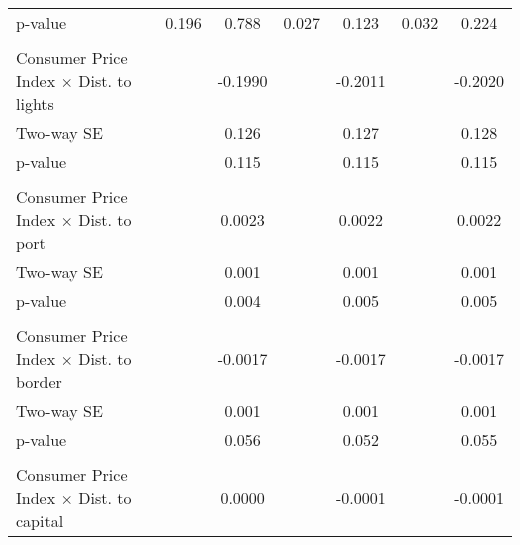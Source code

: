 {\begin{tabular}{l*{6}{c}}
\hspace{25pt} p-value&       0.196         &       0.788         &       0.027         &       0.123         &       0.032         &       0.224         \\
\\ Consumer Price Index $\times$ Dist. to lights&                     &     -0.1990         &                     &     -0.2011         &                     &     -0.2020         \\
\hspace{15pt} Two-way SE&                     &       0.126         &                     &       0.127         &                     &       0.128         \\
\hspace{25pt} p-value&                     &       0.115         &                     &       0.115         &                     &       0.115         \\
\\ Consumer Price Index $\times$ Dist. to port&                     &      0.0023         &                     &      0.0022         &                     &      0.0022         \\
\hspace{15pt} Two-way SE&                     &       0.001         &                     &       0.001         &                     &       0.001         \\
\hspace{25pt} p-value&                     &       0.004         &                     &       0.005         &                     &       0.005         \\
\\ Consumer Price Index $\times$ Dist. to border&                     &     -0.0017         &                     &     -0.0017         &                     &     -0.0017         \\
\hspace{15pt} Two-way SE&                     &       0.001         &                     &       0.001         &                     &       0.001         \\
\hspace{25pt} p-value&                     &       0.056         &                     &       0.052         &                     &       0.055         \\
\\ Consumer Price Index $\times$ Dist. to capital&                     &      0.0000         &                     &     -0.0001         &                     &     -0.0001         \\

\end{tabular}}
